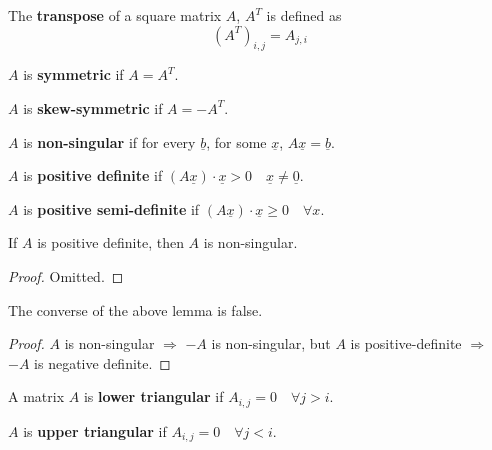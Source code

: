 \begin{definition}
	The \textbf{transpose} of a square matrix $A$, $A^T$ is defined as
	\[
		{(A^T)}_{i, j} = A_{j, i}
	\]
\end{definition}

\begin{definition}
	$A$ is \textbf{symmetric} if $A = A^T$.
\end{definition}

\begin{definition}
	$A$ is \textbf{skew-symmetric} if $A = -A^T$.
\end{definition}

\begin{definition}
	$A$ is \textbf{non-singular} if for every $\underline{b}$, for some $\underline{x}$, $A\underline{x} = \underline{b}$.
\end{definition}

\begin{definition}
	$A$ is \textbf{positive definite} if $(A \underline{x}) \cdot \underline{x} > 0 \quad \underline{x} \ne \underline{0}$.
\end{definition}

\begin{definition}
	$A$ is \textbf{positive semi-definite} if $(A \underline{x}) \cdot \underline{x} \ge 0 \quad \forall x$.
\end{definition}

\begin{lemma}
	If $A$ is positive definite, then $A$ is non-singular.
\end{lemma}

\begin{proof}
	Omitted.
\end{proof}

\begin{lemma}
	The converse of the above lemma is false.
\end{lemma}

\begin{proof}
	$A$ is non-singular $\Rightarrow$ $-A$ is non-singular, but $A$ is positive-definite $\Rightarrow$ $-A$ is negative definite.
\end{proof}

\begin{definition}
	A matrix $A$ is \textbf{lower triangular} if $A_{i, j} = 0 \quad \forall j > i$.
\end{definition}

\begin{definition}
	$A$ is \textbf{upper triangular} if $A_{i, j} = 0 \quad \forall j < i$.
\end{definition}

